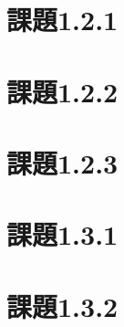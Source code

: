 \documentclass[uplatex, 11pt,a4j, titlepage]{jsarticle}
\begin{document}

\newpage


\subtitle{2020/10/*}

\section{課題1.2.1}
\section{課題1.2.2}
\section{課題1.2.3}

\newpage



\subtitle{2019/*/*}

\section{課題1.3.1}
\section{課題1.3.2}


\newpage
\thispagestyle{empty}
\nocite{key1}
\nocite{key2}


\end{document}
